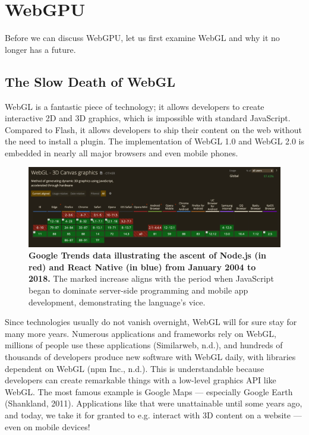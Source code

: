 \documentclass[10pt]{article}
\begin{document}
\begin{sloppypar}
  \section{WebGPU}
  \label{sec:webgpu}

  Before we can discuss WebGPU, let us first examine WebGL and why it no longer has a future.

  \subsection{The Slow Death of WebGL}
  \label{subsec:the-slow-death-of-webgl}

  WebGL is a fantastic piece of technology; it allows developers to create interactive 2D and 3D graphics, which is impossible with standard JavaScript. Compared to Flash, it allows developers to ship their content on the web without the need to install a plugin. The implementation of WebGL 1.0 and WebGL 2.0 is embedded in nearly all major browsers and even mobile phones.

  \begin{figure}[ht]
    \centering
    \includegraphics[width=\textwidth]{figures/can-i-use.png}
    \caption[Google Trends data illustrating the ascent of Node.js and React Native.]{\textbf{Google Trends data illustrating the ascent of Node.js (in red) and React Native (in blue) from January 2004 to 2018.} The marked increase aligns with the period when JavaScript began to dominate server-side programming and mobile app development, demonstrating the language’s vice.}
    \label{fig:can-i-use}
  \end{figure}

  Since technologies usually do not vanish overnight, WebGL will for sure stay for many more years. Numerous applications and frameworks rely on WebGL, millions of people use these applications (Similarweb, n.d.), and hundreds of thousands of developers produce new software with WebGL daily, with libraries dependent on WebGL (npm Inc., n.d.). This is understandable because developers can create remarkable things with a low-level graphics API like WebGL. The most famous example is Google Maps — especially Google Earth (Shankland, 2011). Applications like that were unattainable until some years ago, and today, we take it for granted to e.g. interact with 3D content on a website — even on mobile devices!


\end{sloppypar}
\end{document}
